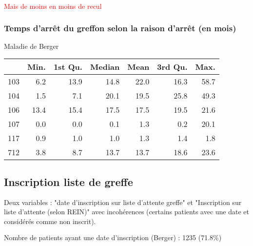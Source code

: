 \documentclass[11pt,a4paper]{article}\usepackage[]{graphicx}\usepackage[]{color}
\begin{document}
\textcolor{red}{Mais de moins en moins de recul}

    \subsubsection{Temps d'arrêt du greffon selon la raison d'arrêt (en mois)}

Maladie de Berger

\begin{table}[H]
\centering
\begin{tabular}{lrrrrrr}
  \hline
 & Min. & 1st Qu. & Median & Mean & 3rd Qu. & Max. \\ 
  \hline
103 & 6.2 & 13.9 & 14.8 & 22.0 & 16.3 & 58.7 \\ 
  104 & 1.5 & 7.1 & 20.1 & 19.5 & 25.8 & 49.3 \\ 
  106 & 13.4 & 15.4 & 17.5 & 17.5 & 19.5 & 21.6 \\ 
  107 & 0.0 & 0.0 & 0.1 & 1.3 & 0.2 & 20.1 \\ 
  117 & 0.9 & 1.0 & 1.0 & 1.3 & 1.4 & 1.8 \\ 
  712 & 3.8 & 8.7 & 13.7 & 13.7 & 18.6 & 23.6 \\ 
   \hline
\end{tabular}
\end{table}



% 

  \subsection{Inscription liste de greffe}

Deux variables : "date d'inscription sur liste d'attente greffe" et "Inscription sur liste d'attente (selon REIN)" avec incohérences (certains patients avec une date et considérés comme non inscrit).

Nombre de patients ayant une date d'inscription (Berger) : 1235 (71.8\%)
\end{document}
